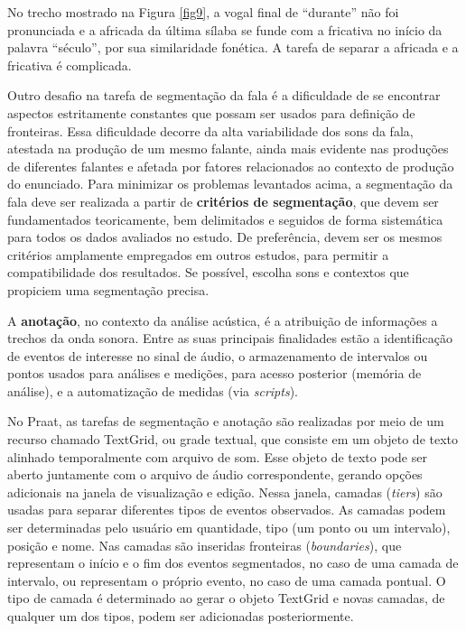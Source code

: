\documentclass[portuguese]{textolivre}
\begin{document}
No trecho mostrado na Figura \ref{fig9}, a vogal final de ``durante'' não foi pronunciada e a africada da última sílaba se funde com a fricativa no início da palavra ``século'', por sua similaridade fonética. A tarefa de separar a africada e a fricativa é complicada.

Outro desafio na tarefa de segmentação da fala é a dificuldade de se encontrar aspectos estritamente constantes que possam ser usados para definição de fronteiras. Essa dificuldade decorre da alta variabilidade dos sons da fala, atestada na produção de um mesmo falante, ainda mais evidente nas produções de diferentes falantes e afetada por fatores relacionados ao contexto de produção do enunciado. Para minimizar os problemas levantados acima, a segmentação da fala deve ser realizada a partir de \textbf{critérios de segmentação}, que devem ser fundamentados teoricamente, bem delimitados e seguidos de forma sistemática para todos os dados avaliados no estudo. De preferência, devem ser os mesmos critérios amplamente empregados em outros estudos, para permitir a compatibilidade dos resultados. Se possível, escolha sons e contextos que propiciem uma segmentação precisa. 

A \textbf{anotação}, no contexto da análise acústica, é a atribuição de informações a trechos da onda sonora. Entre as suas principais finalidades estão a identificação de eventos de interesse no sinal de áudio, o armazenamento de intervalos ou pontos usados para análises e medições, para acesso posterior (memória de análise), e a automatização de medidas (via \textit{scripts}). 

No Praat, as tarefas de segmentação e anotação são realizadas por meio de um recurso chamado TextGrid, ou grade textual, que consiste em um objeto de texto alinhado temporalmente com arquivo de som. Esse objeto de texto pode ser aberto juntamente com o arquivo de áudio correspondente, gerando opções adicionais na janela de visualização e edição. Nessa janela, camadas (\textit{tiers}) são usadas para separar diferentes tipos de eventos observados. As camadas podem ser determinadas pelo usuário em quantidade, tipo (um ponto ou um intervalo), posição e nome. Nas camadas são inseridas fronteiras (\textit{boundaries}), que representam o início e o fim dos eventos segmentados, no caso de uma camada de intervalo, ou representam o próprio evento, no caso de uma camada pontual. O tipo de camada é determinado ao gerar o objeto TextGrid e novas camadas, de qualquer um dos tipos, podem ser adicionadas posteriormente. 
\end{document}
